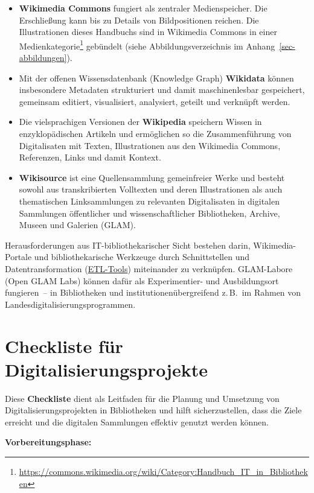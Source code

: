 \documentclass[
  11pt,
  letterpaper,
  DIV=11,
  twoside]{scrreprt}
\DeclareRobustCommand{\href}[2]{#2\footnote{\url{#1}}}
\begin{document}
\begin{itemize}
\item
  \textbf{Wikimedia Commons} fungiert als zentraler Medienspeicher. Die
  Erschließung kann bis zu Details von Bildpositionen reichen. Die
  Illustrationen dieses Handbuchs sind in Wikimedia Commons
  \href{https://commons.wikimedia.org/wiki/Category:Handbuch_IT_in_Bibliotheken}{in
  einer Medienkategorie} gebündelt (siehe Abbildungsverzeichnis im
  Anhang~\ref{sec-abbildungen}).
\item
  Mit der offenen Wissensdatenbank (Knowledge Graph) \textbf{Wikidata}
  können insbesondere Metadaten strukturiert und damit maschinenlesbar
  gespeichert, gemeinsam editiert, visualisiert, analysiert, geteilt und
  verknüpft werden.
\item
  Die vielsprachigen Versionen der \textbf{Wikipedia} speichern Wissen
  in enzyklopädischen Artikeln und ermöglichen so die Zusammenführung
  von Digitalisaten mit Texten, Illustrationen aus den Wikimedia
  Commons, Referenzen, Links und damit Kontext.
\item
  \textbf{Wikisource} ist eine Quellensammlung gemeinfreier Werke und
  besteht sowohl aus transkribierten Volltexten und deren Illustrationen
  als auch thematischen Linksammlungen zu relevanten Digitalisaten in
  digitalen Sammlungen öffentlicher und wissenschaftlicher Bibliotheken,
  Archive, Museen und Galerien (GLAM).
\end{itemize}

Herausforderungen aus IT-bibliothekarischer Sicht bestehen darin,
Wikimedia-Portale und bibliothekarische Werkzeuge durch Schnittstellen
und Datentransformation (\hyperref[etl-prozess]{ETL-Tools}) miteinander
zu verknüpfen. GLAM-Labore (Open GLAM Labs) können dafür als
Experimentier- und Ausbildungsort fungieren~-- in Bibliotheken und
institutionenübergreifend z.\,B.~im Rahmen von
Landesdigitalisierungsprogrammen.

\section{Checkliste für
Digitalisierungsprojekte}\label{checkliste-fuxfcr-digitalisierungsprojekte}

Diese \textbf{Checkliste} dient als Leitfaden für die Planung und
Umsetzung von Digitalisierungsprojekten in Bibliotheken und hilft
sicherzustellen, dass die Ziele erreicht und die digitalen Sammlungen
effektiv genutzt werden können.

\textbf{Vorbereitungsphase:}
\end{document}
